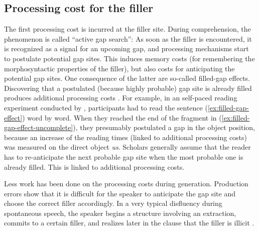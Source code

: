 \subsection{Processing cost for the filler}

The first processing cost is incurred at the filler site. During comprehension, the phenomenon is called ``active gap search'': As soon as the filler is encountered, it is recognized as a signal for an upcoming gap, and processing mechanisms start to postulate potential gap sites. This induces memory costs (for remembering the morphosyntactic properties of the filler), but also costs for anticipating the potential gap sites. One consequence of the latter are so-called filled-gap effects. Discovering that a postulated (because highly probable) gap site is already filled produces additional processing costs \citep{Stowe.1986}. For example, in an self-paced reading experiment conducted by \citeauthor{Stowe.1986}, participants had to read the sentence (\ref{ex:filled-gap-effect}) word by word. When they reached the end of the fragment in (\ref{ex:filled-gap-effect-uncomplete}), they presumably postulated a gap in the object position, because an increase of the reading times (linked to additional processing costs) was measured on the direct object \emph{us}. Scholars generally assume that the reader has to re-anticipate the next probable gap site when the most probable one is already filled. This is linked to additional processing costs.

\begin{exe}
\ex \citep[234]{Stowe.1986}
\begin{xlist}
\label{ex:filled-gap-effect}
\label{ex:filled-gap-effect-uncomplete}
\end{xlist}
\end{exe}

Less work has been done on the processing costs during generation. Production errors show that it is difficult for the speaker to anticipate the gap site and choose the correct filler accordingly. In a very typical disfluency during spontaneous speech, the speaker begins a structure involving an extraction, commits to a certain filler, and realizes later in the clause that the filler is illicit \citep[243]{Momma.2018}.

